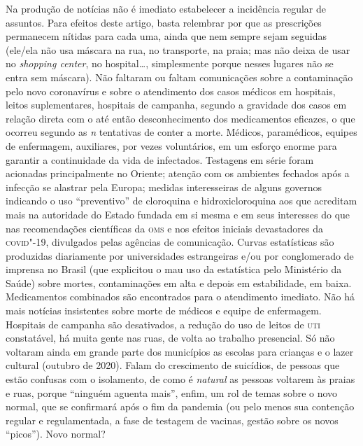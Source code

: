 Na produção de notícias não é imediato estabelecer a incidência regular
de assuntos. Para efeitos deste artigo, basta relembrar por que as
prescrições permanecem nítidas para cada uma, ainda que nem sempre sejam
seguidas (ele/ela não usa máscara na rua, no transporte, na praia; mas
não deixa de usar no \emph{shopping center}, no hospital\ldots{},
simplesmente porque nesses lugares não se entra sem máscara). Não
faltaram ou faltam comunicações sobre a contaminação pelo novo
coronavírus e sobre o atendimento dos casos médicos em hospitais, leitos
suplementares, hospitais de campanha, segundo a gravidade dos casos em
relação direta com o até então desconhecimento dos medicamentos
eficazes, o que ocorreu segundo as \emph{n} tentativas de conter a
morte. Médicos, paramédicos, equipes de enfermagem, auxiliares, por
vezes voluntários, em um esforço enorme para garantir a continuidade da
vida de infectados. Testagens em série foram acionadas principalmente no
Oriente; atenção com os ambientes fechados após a infecção se alastrar
pela Europa; medidas interesseiras de alguns governos indicando o uso
``preventivo'' de cloroquina e hidroxicloroquina aos que acreditam mais
na autoridade do Estado fundada em si mesma e em seus interesses do que
nas recomendações científicas da \textsc{oms} e nos efeitos iniciais devastadores
da \textsc{covid}"-19, divulgados pelas agências de comunicação. Curvas
estatísticas são produzidas diariamente por universidades estrangeiras
e/ou por conglomerado de imprensa no Brasil (que explicitou o mau uso da
estatística pelo Ministério da Saúde) sobre mortes, contaminações em
alta e depois em estabilidade, em baixa. Medicamentos combinados são
encontrados para o atendimento imediato. Não há mais notícias
insistentes sobre morte de médicos e equipe de enfermagem. Hospitais de
campanha são desativados, a redução do uso de leitos de \textsc{uti} constatável,
há muita gente nas ruas, de volta ao trabalho presencial. Só não
voltaram ainda em grande parte dos municípios as escolas para crianças e
o lazer cultural (outubro de 2020). Falam do crescimento de suicídios,
de pessoas que estão confusas com o isolamento, de como é \emph{natural}
as pessoas voltarem às praias e ruas, porque ``ninguém aguenta mais'',
enfim, um rol de temas sobre o novo normal, que se confirmará após o fim
da pandemia (ou pelo menos sua contenção regular e regulamentada, a fase
de testagem de vacinas, gestão sobre os novos ``picos''). Novo normal?

